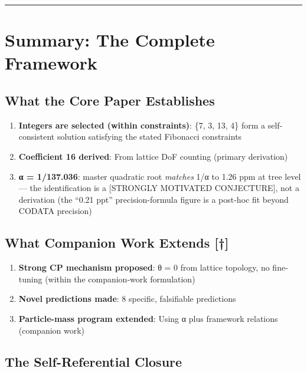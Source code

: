 \documentclass[
  11pt,
  letterpaper,
  twoside,
  openright]{book}
\providecommand{\tightlist}{%
  \setlength{\itemsep}{0pt}\setlength{\parskip}{0pt}}
\begin{document}
\begin{center}\rule{0.5\linewidth}{0.5pt}\end{center}

\section{Summary: The Complete
Framework}\label{summary-the-complete-framework}

\subsection{What the Core Paper
Establishes}\label{what-the-core-paper-establishes}

\begin{enumerate}
\def\labelenumi{\arabic{enumi}.}
\tightlist
\item
  \textbf{Integers are selected (within constraints)}: \{7, 3, 13, 4\}
  form a self-consistent solution satisfying the stated Fibonacci
  constraints
\item
  \textbf{Coefficient 16 derived}: From lattice DoF counting (primary
  derivation)
\item
  \textbf{α = 1/137.036}: master quadratic root \emph{matches} 1/α to
  1.26 ppm at tree level --- the identification is a {[}STRONGLY
  MOTIVATED CONJECTURE{]}, not a derivation (the ``0.21 ppt''
  precision-formula figure is a post-hoc fit beyond CODATA precision)
\end{enumerate}

\subsection{What Companion Work Extends
{[}†{]}}\label{what-companion-work-extends}

\begin{enumerate}
\def\labelenumi{\arabic{enumi}.}
\tightlist
\item
  \textbf{Strong CP mechanism proposed}: θ = 0 from lattice topology, no
  fine-tuning (within the companion-work formulation)
\item
  \textbf{Novel predictions made}: 8 specific, falsifiable predictions
\item
  \textbf{Particle-mass program extended}: Using α plus framework
  relations (companion work)
\end{enumerate}

\subsection{The Self-Referential
Closure}\label{the-self-referential-closure}
\end{document}
